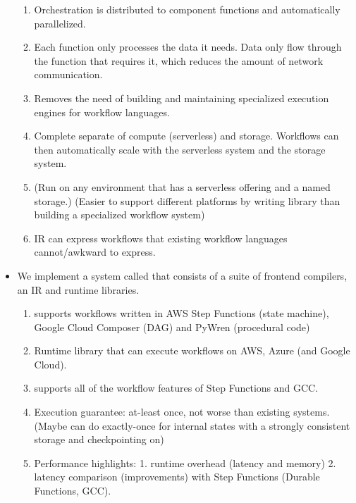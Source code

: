\begin{itemize}
    \begin{enumerate}

      \item Orchestration is distributed to component functions and
      automatically parallelized.

      \item Each function only processes the data it needs. Data only flow
      through the function that requires it, which reduces the amount of
      network communication.

      \item Removes the need of building and maintaining specialized execution
      engines for workflow languages.

      \item Complete separate of compute (serverless) and storage.
      Workflows can then automatically scale with the serverless system and
      the storage system.

      \item (Run on any environment that has a serverless offering and a named
      storage.) (Easier to support different platforms by writing library than
      building a specialized workflow system)

      \item IR can express workflows that existing workflow languages
      cannot/awkward to express.

    \end{enumerate}

  \item We implement a system called \name{} that consists of a suite of
  frontend compilers, an IR and runtime libraries.

  \begin{enumerate}
    \item supports workflows written in AWS Step Functions (state machine),
  Google Cloud Composer (DAG) and PyWren (procedural code)

    \item Runtime library that can execute workflows on AWS, Azure (and Google Cloud).

    \item supports all of the workflow features of Step Functions and GCC.

    \item Execution guarantee: at-least once, not worse than existing systems.
  (Maybe can do exactly-once for internal states with a strongly consistent
  storage and checkpointing on)

    \item Performance highlights: 1. runtime overhead (latency and memory) 2.
    latency comparison (improvements) with Step Functions (Durable Functions,
    GCC).
  \end{enumerate}

\end{itemize}


